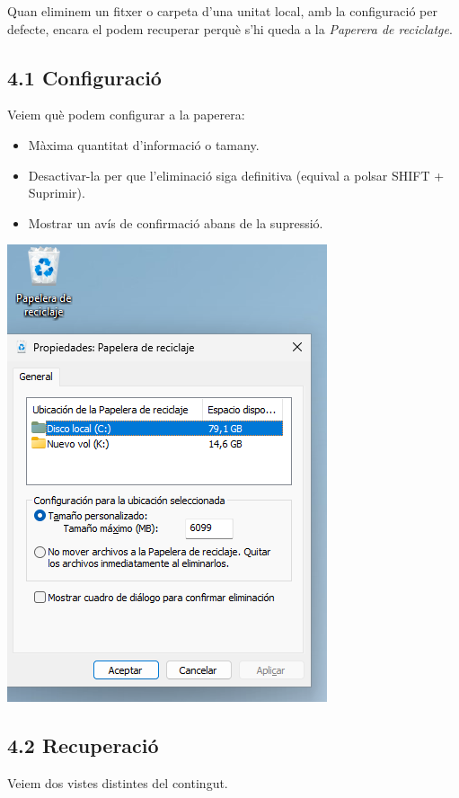 \documentclass[
  a4paper,
]{article}
\providecommand{\tightlist}{%
  \setlength{\itemsep}{0pt}\setlength{\parskip}{0pt}}
\begin{document}
Quan eliminem un fitxer o carpeta d'una unitat local, amb la
configuració per defecte, encara el podem recuperar perquè s'hi queda a
la \emph{Paperera de reciclatge}.

\subsection{4.1 Configuració}\label{configuraciuxf3}

Veiem què podem configurar a la paperera:

\begin{itemize}
\tightlist
\item
  Màxima quantitat d'informació o tamany.
\item
  Desactivar-la per que l'eliminació siga definitiva (equival a polsar
  SHIFT + Suprimir).
\item
  Mostrar un avís de confirmació abans de la supressió.
\end{itemize}

\includegraphics{png/paperera.png}

\subsection{4.2 Recuperació}\label{recuperaciuxf3}

Veiem dos vistes distintes del contingut.
\end{document}
